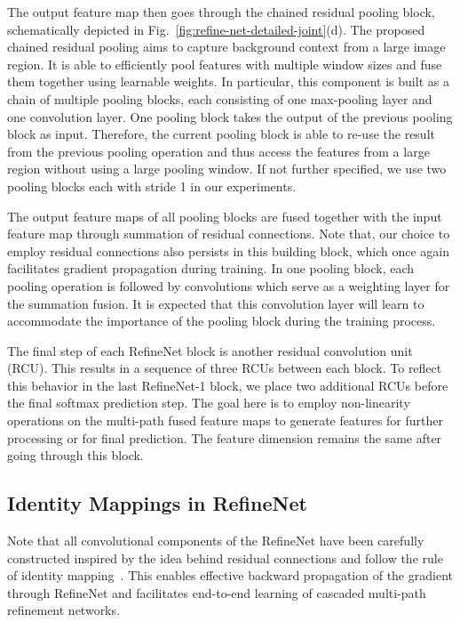\documentclass[10pt,twocolumn,letterpaper]{article}
\newcommand{\Fig}{Fig.\xspace}
\begin{document}
The output feature map then goes through the chained residual pooling block, schematically depicted in \Fig~\ref{fig:refine-net-detailed-joint}(d).
The proposed chained residual pooling aims to capture background context from a large image region.
It is able to efficiently pool features with multiple window sizes and fuse them together using learnable weights.
In particular, this component is built as a chain of multiple pooling blocks, each consisting of one max-pooling layer and one convolution layer.
One pooling block takes the output of the previous pooling block as input. 
Therefore, the current pooling block is able to re-use the result from the previous pooling operation and thus access the features from a large region without using a large pooling window.
If not further specified, we use two pooling blocks each with stride 1 in our experiments.

The output feature maps of all pooling blocks are fused together with the input feature map through summation of residual connections.
Note that, our choice to employ residual connections also persists in this building block, which once again facilitates gradient propagation during training.
In one pooling block, each pooling operation is followed by convolutions which serve as a weighting layer for the summation fusion.
It is expected that this convolution layer will learn to accommodate the importance of the pooling block during the training process.

The final step of each RefineNet block is another residual convolution unit (RCU). This results in a sequence of three RCUs between each block. To reflect this behavior in the last RefineNet-1 block, we place two additional RCUs before the final softmax prediction step.
The goal here is to employ non-linearity operations on the multi-path fused feature maps to generate features for further processing or for final prediction.
The feature dimension remains the same after going through this block.

\subsection{Identity Mappings in RefineNet}
Note that all convolutional components of the RefineNet have been carefully constructed inspired by the idea behind residual connections and follow the rule of identity mapping~\cite{he2016identity}. 
This enables effective backward propagation of the gradient through RefineNet and facilitates end-to-end learning of cascaded multi-path refinement networks.
\end{document}
